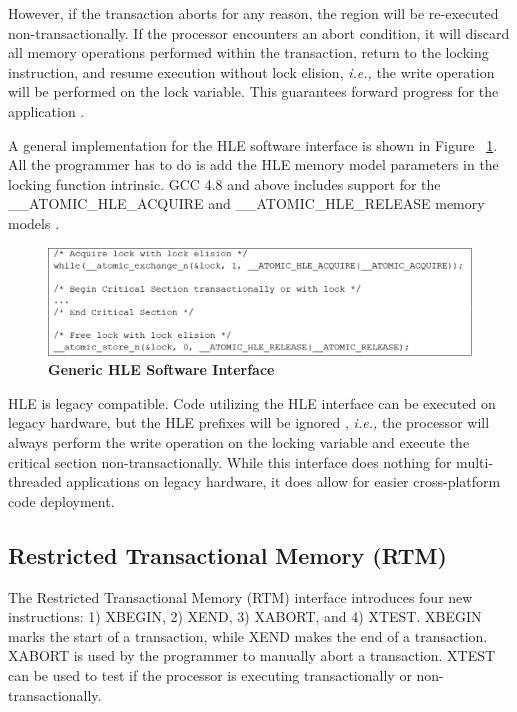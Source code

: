 \documentclass[11pt]{book}
\begin{document}
However, if the transaction aborts for any reason, the region will be re-executed
non-transactionally.  If the processor encounters an abort condition, it will discard all
memory operations performed within the transaction, return to the locking instruction, and
resume execution without lock elision, \emph{i.e.,} the write operation will be performed on the
lock variable.  This guarantees forward progress for the application
\cite{intel_prog_ref}.

A general implementation for the HLE software interface is shown in Figure
~\ref{fig:hle_interface}.  All the programmer has to do is add the HLE memory model
parameters in the locking function intrinsic.  GCC 4.8 and above includes support for the
\_\_ATOMIC\_HLE\_ACQUIRE and \_\_ATOMIC\_HLE\_RELEASE memory models \cite{gcc}.

\begin{figure}[H]
    \centering
    \graphicspath{ {./figures/} }
    \includegraphics[width=\textwidth,height=\textheight,keepaspectratio]{fig_hleInterface}
    \caption{\textbf{Generic HLE Software Interface}}
    \label{fig:hle_interface}
\end{figure}

HLE is legacy compatible.  Code utilizing the HLE interface can be executed on legacy
hardware, but the HLE prefixes will be ignored \cite{intel_prog_ref}, \emph{i.e.,} the
processor will always perform the write operation on the locking variable and execute the
critical section non-transactionally.  While this interface does nothing for
multi-threaded applications on legacy hardware, it does allow for easier cross-platform
code deployment.

\subsection{Restricted Transactional Memory (RTM)}\label{sec:rtm}

The Restricted Transactional Memory (RTM) interface introduces four new instructions: 1)
XBEGIN, 2) XEND, 3) XABORT, and 4) XTEST.  XBEGIN marks the start of a transaction, while
XEND makes the end of a transaction.  XABORT is used by the programmer to manually abort a
transaction.  XTEST can be used to test if the processor is executing transactionally or
non-transactionally.
\end{document}
